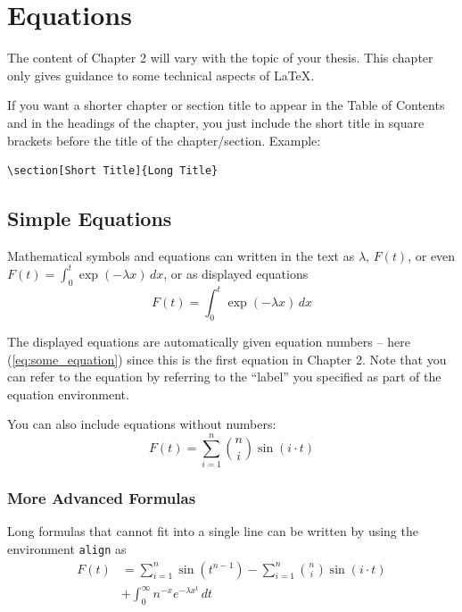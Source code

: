 \documentclass[../Main/thesis.tex]{subfiles}
\begin{document}
\chapter[Equations, etc]{Equations}
\label{ch:equations}
The content of Chapter 2 will vary with the topic of your thesis. 
This chapter only gives guidance to some technical aspects of \LaTeX.
	 
\begin{remark}
If you want a shorter chapter or section title to appear in the Table of Contents and in the headings of the chapter, you just include the short title in square brackets before the title of the chapter/section. 
Example: \begin{verbatim}\section[Short Title]{Long Title}\end{verbatim}
\end{remark}

\section{Simple Equations}
\label{sec:simple_equations}
Mathematical symbols and equations can written in the text as $\lambda$, $F(t)$, or even $F(t)=\int_0^t \exp(-\lambda x)\,dx$, or as displayed equations
\begin{equation}
F(t)=\int_0^t \exp(-\lambda x)\,dx
\label{eq:some_equation}
\end{equation}


The displayed equations are automatically given equation numbers -- here (\ref{eq:some_equation}) since this is the first equation in Chapter 2. 
Note that you can refer to the equation by referring to the ``label'' you specified as part of the equation environment.

You can also include equations without numbers:
\begin{equation*}
F(t)=\sum_{i=1}^n \binom{n}{i}\sin(i\cdot t)
\end{equation*}

\subsection*{More Advanced Formulas}
Long formulas that cannot fit into a single line can be written by using the environment \texttt{align} as
\begin{align}
F(t)&= \sum_{i=1}^n \sin(t^{n-1}) - \sum_{i=1}^n \binom{n}{i}\sin(i\cdot t) \\
      & + \int_0^\infty n^{-x} e^{-\lambda x^t}\,dt
\end{align}
\end{document}
